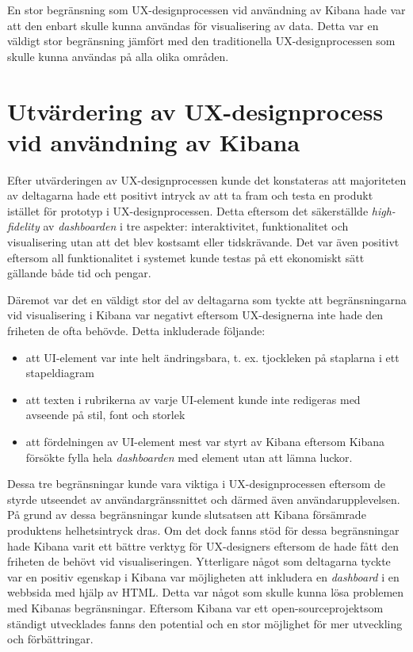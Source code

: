 \documentclass[12pt]{kththesis}
\begin{document}
En stor begränsning som UX-designprocessen vid användning av Kibana hade var att den enbart skulle kunna användas för visualisering av data. Detta var en väldigt stor begränsning jämfört med den traditionella UX-designprocessen som skulle kunna användas på alla olika områden. 

\section{Utvärdering av UX-designprocess vid användning av Kibana}
Efter utvärderingen av UX-designprocessen kunde det konstateras att majoriteten av deltagarna hade ett positivt intryck av att ta fram och testa en produkt istället för prototyp i UX-designprocessen. Detta eftersom det säkerställde \textit{high-fidelity} av \textit{dashboarden} i tre aspekter: interaktivitet, funktionalitet och visualisering utan att det blev kostsamt eller tidskrävande. Det var även positivt eftersom all funktionalitet i systemet kunde testas på ett ekonomiskt sätt gällande både tid och pengar. 

Däremot var det en väldigt stor del av deltagarna som tyckte att begränsningarna vid visualisering i Kibana var negativt eftersom UX-designerna inte hade den friheten de ofta behövde. Detta inkluderade följande: 
\begin{itemize}
\item att UI-element var inte helt ändringsbara, t. ex. tjockleken på staplarna i ett stapeldiagram
\item att texten i rubrikerna av varje UI-element kunde inte redigeras med avseende på stil, font och storlek
\item att fördelningen av UI-element mest var styrt av Kibana eftersom Kibana försökte fylla hela \textit{dashboarden} med element utan att lämna luckor. 
\end{itemize}

Dessa tre begränsningar kunde vara viktiga i UX-designprocessen eftersom de styrde utseendet av användargränssnittet och därmed även användarupplevelsen. På grund av dessa begränsningar kunde slutsatsen att Kibana försämrade produktens helhetsintryck dras. Om det dock fanns stöd för dessa begränsningar hade Kibana varit ett bättre verktyg för UX-designers eftersom de hade fått den friheten de behövt vid visualiseringen. Ytterligare något som deltagarna tyckte var en positiv egenskap i Kibana var möjligheten att inkludera en \textit{dashboard} i en webbsida med hjälp av HTML. Detta var något som skulle kunna lösa problemen med Kibanas begränsningar. Eftersom Kibana var ett open-sourceprojektsom ständigt utvecklades fanns den potential och en stor möjlighet för mer utveckling och förbättringar.
\end{document}
